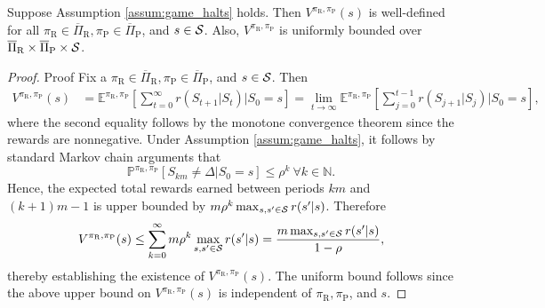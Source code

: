 \documentclass[opre,dblanonrev]{informs4}
\begin{document}
\begin{APPENDICES}
       \begin{lemma}
           \label{lem:sg_pol_val_well_defined}
           Suppose Assumption \ref{assum:game_halts} holds. Then $V^{\pi_\text{R},\pi_\text{P}}(s)$ is well-defined for all $\pi_\text{R} \in \overline\Pi_\text{R}, \pi_\text{P} \in \overline\Pi_\text{P}$, and $s \in {\cal S}$. Also, $V^{\pi_\text{R},\pi_\text{P}}$ is uniformly bounded over $\overline\Pi_\text{R} \times \overline\Pi_\text{P} \times {\cal S}$.  
       \end{lemma}       
       \begin{proof}{Proof}
           Fix a $\pi_\text{R} \in \overline\Pi_\text{R}, \pi_\text{P} \in \overline\Pi_\text{P}$, and $s \in {\cal S}$. Then 
           \begingroup
           \allowdisplaybreaks
           \begin{align*}
               V^{\pi_\text{R},\pi_\text{P}}(s) &= \mathbb{E}^{\pi_\text{R},\pi_\text{P}}\left[\sum_{t=0}^\infty r(S_{t+1}|S_t) \Big| S_0 = s\right] = \lim_{t \to \infty} \mathbb{E}^{\pi_\text{R},\pi_\text{P}}\left[\sum_{j=0}^{t-1} r(S_{j+1}|S_j) \Big| S_0 = s\right],
           \end{align*}
           \endgroup
           where the second equality follows by the monotone convergence theorem since the rewards are nonnegative. Under Assumption \ref{assum:game_halts}, it follows by standard Markov chain arguments that
           \[
           \mathbb{P}^{\pi_\text{R}, \pi_\text{P}}[S_{km} \neq \Delta|S_0=s] \leq \rho^k \ \forall k \in \mathbb{N}.
           \]
           Hence, the expected total rewards earned between periods $km$ and $(k+1)m - 1$ is upper bounded by $m\rho^k \max_{s,s' \in {\cal S}}r(s'|s)$. Therefore
           \[
           V^{\pi_\text{R},\pi_\text{P}}(s) \leq \sum_{k=0}^\infty m\rho^k \max_{s,s' \in {\cal S}}r(s'|s) = \frac{m \max_{s,s' \in {\cal S}}r(s'|s)}{1-\rho},
           \]
           thereby establishing the existence of $V^{\pi_\text{R},\pi_\text{P}}(s)$. The uniform bound follows since the above upper bound on $V^{\pi_\text{R},\pi_\text{P}}(s)$ is independent of $\pi_\text{R},\pi_\text{P}$, and $s$.\Halmos
       \end{proof}
       

\end{APPENDICES}
\end{document}
